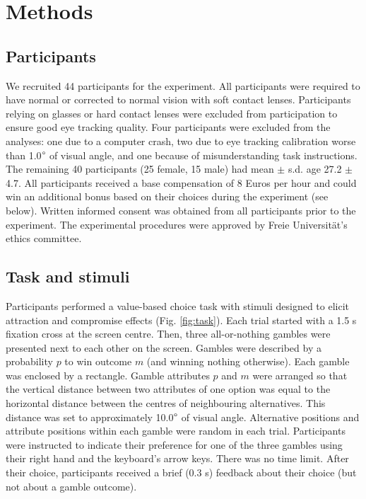 \documentclass[11pt, a4paper]{article}
\begin{document}
\section*{Methods}
\label{sec:methods}

\subsection*{Participants}

We recruited 44 participants for the experiment. All participants were required to have normal or corrected to normal vision with soft contact lenses. Participants relying on glasses or hard contact lenses were excluded from participation to ensure good eye tracking quality. Four participants were excluded from the analyses: one due to a computer crash, two due to eye tracking calibration worse than 1.0$\degree$ of visual angle, and one because of misunderstanding task instructions.  The remaining 40 participants (25 female, 15 male) had mean $\pm$ s.d. age 27.2 $\pm$ 4.7. All participants received a base compensation of 8 Euros per hour and could win an additional bonus based on their choices during the experiment (see below). Written informed consent was obtained from all participants prior to the experiment. The experimental procedures were approved by Freie Universität’s ethics committee.

\subsection*{Task and stimuli}
\label{sec:methods:task-stimuli}

Participants performed a value-based choice task with stimuli designed to elicit attraction and compromise effects (Fig. \ref{fig:task}). Each trial started with a 1.5 s fixation cross at the screen centre. Then, three all-or-nothing gambles were presented next to each other on the screen. Gambles were described by a probability $p$ to win outcome $m$ (and winning nothing otherwise). Each gamble was enclosed by a rectangle. Gamble attributes $p$ and $m$ were arranged so that the vertical distance between two attributes of one option was equal to the horizontal distance between the centres of neighbouring alternatives. This distance was set to approximately 10.0$\degree$ of visual angle. Alternative positions and attribute positions within each gamble were random in each trial. Participants were instructed to indicate their preference for one of the three gambles using their right hand and the keyboard’s arrow keys. There was no time limit. After their choice, participants received a brief (0.3 s) feedback about their choice (but not about a gamble outcome).
\end{document}
